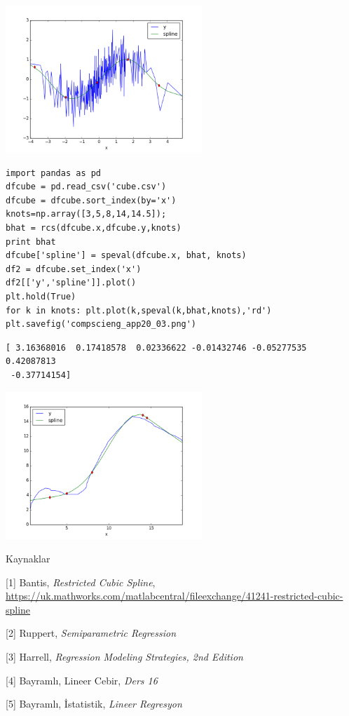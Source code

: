 \documentclass[12pt,fleqn]{article}\usepackage{../../common}
\begin{document}
\includegraphics[width=20em]{compscieng_app20_01.png}

\begin{verbatim}
import pandas as pd
dfcube = pd.read_csv('cube.csv')
dfcube = dfcube.sort_index(by='x')
knots=np.array([3,5,8,14,14.5]);
bhat = rcs(dfcube.x,dfcube.y,knots)
print bhat
dfcube['spline'] = speval(dfcube.x, bhat, knots)
df2 = dfcube.set_index('x')
df2[['y','spline']].plot()
plt.hold(True)
for k in knots: plt.plot(k,speval(k,bhat,knots),'rd')
plt.savefig('compscieng_app20_03.png')
\end{verbatim}

\begin{verbatim}
[ 3.16368016  0.17418578  0.02336622 -0.01432746 -0.05277535  0.42087813
 -0.37714154]
\end{verbatim}

\includegraphics[width=20em]{compscieng_app20_03.png}


Kaynaklar

[1] Bantis, {\em Restricted Cubic Spline}, \url{https://uk.mathworks.com/matlabcentral/fileexchange/41241-restricted-cubic-spline}

[2] Ruppert, {\em Semiparametric Regression}

[3] Harrell, {\em Regression Modeling Strategies, 2nd Edition}

[4] Bayramlı, Lineer Cebir, {\em Ders 16}

[5] Bayramlı, İstatistik, {\em Lineer Regresyon}
\end{document}
